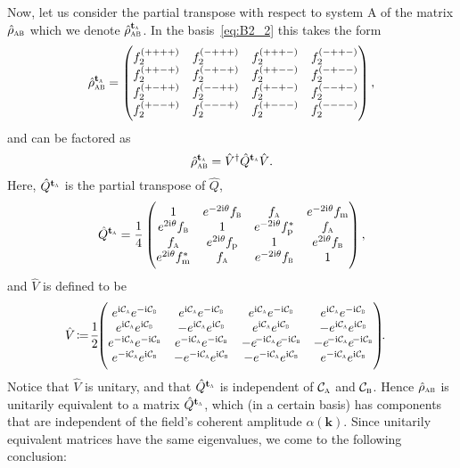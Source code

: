 \documentclass[pra,nofootinbib,floats,aps,twocolumn,tightenlines,superscriptaddress]{revtex4-1}
\newcommand{\ii}{\mathrm{i}}
\newcommand{\rhoab}{\hat{\rho}_\textsc{ab}}
\newcommand{\rhoabpt}{\hat{\rho}_\textsc{ab}^{{\text{\textbf{t}}}_\textsc{a}}}
\newcommand{\ca}{\mathcal{C}_\textsc{a}}
\newcommand{\cb}{\mathcal{C}_\textsc{b}}
\newcommand{\fa}{f_\textsc{a}}
\newcommand{\fb}{f_\textsc{b}}
\newcommand{\fp}{f_\text{p}}
\newcommand{\fm}{f_\text{m}}
\begin{document}
Now, let us consider the partial transpose with respect to system A of the matrix $\rhoab$ which we denote $\rhoabpt$. In the basis~\eqref{eq:B2_2} this takes the form
\begin{equation}
\label{eq:rhoabpt}
    \rhoabpt
    =
    \begin{pmatrix}
    f_2^{(++++)} & f_2^{(-+++)} & f_2^{(+++-)} & f_2^{(-++-)}
    \\
    f_2^{(++-+)} & f_2^{(-+-+)} & f_2^{(++--)} & f_2^{(-+--)}
    \\
    f_2^{(+-++)} & f_2^{(--++)} & f_2^{(+-+-)} & f_2^{(--+-)}
    \\
    f_2^{(+--+)} & f_2^{(---+)} & f_2^{(+---)} & f_2^{(----)}
    \end{pmatrix},
\end{equation}
and can be factored as
\begin{equation}
\label{eq:rho_abpt_fact}
    \rhoabpt
    =
    \hat{V}^\dagger
    \hat{Q}^{{\text{\textbf{t}}}_\textsc{a}} 
    \hat{V}.
\end{equation}
Here, $\hat{Q}^{{\text{\textbf{t}}}_\textsc{a}}$ is the partial transpose of $\hat{Q}$, 
\begin{equation}
\label{eq:Qpt}
    \hat{Q}^{{\text{\textbf{t}}}_\textsc{a}}
    =
    \frac{1}{4}
    \begin{pmatrix}
    1 & e^{-2\ii\theta} \fb & \fa & e^{-2\ii\theta} \fm
    \\
    e^{2\ii\theta} \fb & 1 & e^{-2\ii\theta} \fp^* & \fa
    \\
    \fa & e^{2\ii\theta} \fp & 1 & e^{2\ii\theta} \fb
    \\
    e^{2\ii\theta} \fm^* & \fa & e^{-2\ii\theta} \fb & 1
    \end{pmatrix},
\end{equation}
and $\hat{V}$ is defined to be
\begin{align}
\label{eq:V}
    \hat{V}\!
    &\coloneqq
    \!\frac{1}{2}\!\!
    \begin{pmatrix}
    e^{\ii\ca}e^{-\ii\cb} &
    e^{\ii\ca}e^{-\ii\cb} &
    e^{\ii\ca}e^{-\ii\cb} &
    e^{\ii\ca}e^{-\ii\cb} 
    \\
    e^{\ii\ca}e^{\ii\cb} &
    -e^{\ii\ca}e^{\ii\cb} &
    e^{\ii\ca}e^{\ii\cb} &
    -e^{\ii\ca}e^{\ii\cb} 
    \\
    e^{-\ii\ca}e^{-\ii\cb} &
    e^{-\ii\ca}e^{-\ii\cb} &
    -e^{\!-\ii\ca}e^{\!-\ii\cb} &
    -e^{\!-\ii\ca}e^{\!-\ii\cb} 
    \\
    e^{-\ii\ca}e^{\ii\cb} &
    -e^{-\ii\ca}e^{\ii\cb} &
    -e^{-\ii\ca}e^{\ii\cb} &
    e^{-\ii\ca}e^{\ii\cb}
    \end{pmatrix}\!\!.
\end{align}
Notice that $\hat{V}$ is unitary, and that $\hat{Q}^{{\text{\textbf{t}}}_\textsc{a}}$ is independent of $\ca$ and $\cb$. Hence $\rhoab$ is unitarily equivalent to a matrix $\hat{Q}^{{\text{\textbf{t}}}_\textsc{a}}$, which (in a certain basis) has components that are independent of the field's coherent amplitude $\alpha(\bm k)$. Since unitarily equivalent matrices have the same eigenvalues, we come to the following conclusion:
\end{document}
